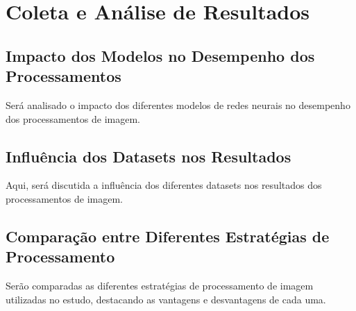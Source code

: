 \chapter{Coleta e Análise de Resultados}
\section{Impacto dos Modelos no Desempenho dos Processamentos}
Será analisado o impacto dos diferentes modelos de redes neurais no desempenho dos processamentos de imagem.

\section{Influência dos Datasets nos Resultados}
Aqui, será discutida a influência dos diferentes datasets nos resultados dos processamentos de imagem.

\section{Comparação entre Diferentes Estratégias de Processamento}
Serão comparadas as diferentes estratégias de processamento de imagem utilizadas no estudo, destacando as vantagens e desvantagens de cada uma.
